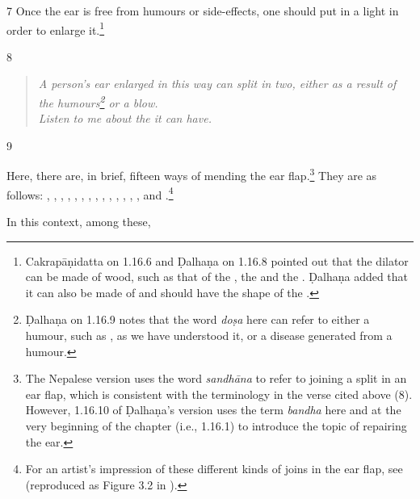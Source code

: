 \begin{translation}
    \item[7]
    Once the ear is free from humours or side-effects, one should 
    put in a light  in order to enlarge 
    it.\footnote{Cakrapāṇidatta on 1.16.6 \citep[127]{acar-1939} and Ḍalhaṇa on 1.16.8 
    \citep[77]{vulgate} pointed out that the dilator can be made of wood, such as that of the 
    , the  and the 
    . Ḍalhaṇa added that it can also be made of  
    and should have the shape of the .}
    
    \item[8]
    
    \begin{quote}
        \itshape
A person's ear enlarged in this way can split in two, either as a result of the 
humours\footnote{Ḍalhaṇa on 1.16.9  \citep[77]{vulgate} notes that the word \emph{doṣa} 
here can refer to either a humour, such as , as we have understood it, or a 
disease generated from a humour.} or a blow.\\ Listen to me about the 
it can have. 
    \end{quote}
    
        \item[9]
    
Here, there are, in brief, fifteen ways of mending the ear flap.\footnote{The Nepalese version uses the word \emph{sandhāna} to refer to joining a split in an ear flap, which is consistent with the terminology in the verse cited above (8). However, 1.16.10 of Ḍalhaṇa's version \citep[77]{vulgate} uses the term \emph{bandha} here and at the very beginning of the chapter (i.e., 1.16.1) to introduce the topic of repairing the ear.}  They are as follows:
    , , , , , , , , , , 
    , ,
    , , and .\footnote{For an artist's impression of these different kinds of joins in the ear flap, see \cite[290]{majn-1975} (reproduced as Figure 3.2 in \cite[154]{wuja-2003}).}
    
    In this context, among these, 
    \begin{description}
        

\end{description}
\end{translation}
